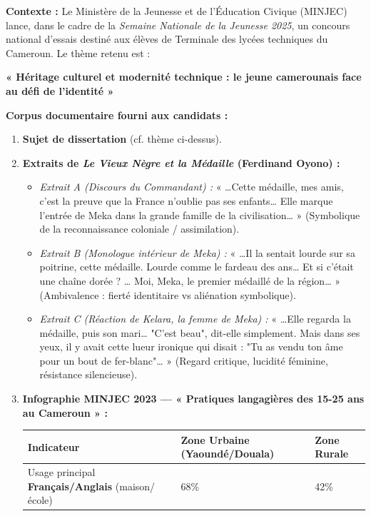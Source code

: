 \documentclass[11pt]{article}
\newcounter{popsec}
\newcounter{popsub}
\newcommand{\courssub}[1]{%
  \stepcounter{popsub}%
  \par\vspace{9pt}\noindent{\popxbold\fontsize{11.5}{13}\selectfont\color{popink}{\color{poporange}\thepopsec.\thepopsub}\hspace{6pt}#1}\par\nopagebreak\vspace{4pt}
}
\begin{document}
\courssub{Situation}
\noindent \textbf{Contexte :} Le Ministère de la Jeunesse et de l'Éducation Civique (MINJEC) lance, dans le cadre de la \emph{Semaine Nationale de la Jeunesse 2025}, un concours national d'essais destiné aux élèves de Terminale des lycées techniques du Cameroun. Le thème retenu est :
\begin{center}
    \textbf{« Héritage culturel et modernité technique : le jeune camerounais face au défi de l'identité »}
\end{center}

\noindent \textbf{Corpus documentaire fourni aux candidats :}
\begin{enumerate}
    \item \textbf{Sujet de dissertation} (cf. thème ci-dessus).
    \item \textbf{Extraits de \emph{Le Vieux Nègre et la Médaille} (Ferdinand Oyono) :}
        \begin{itemize}
            \item \textit{Extrait A (Discours du Commandant) :} « …Cette médaille, mes amis, c'est la preuve que la France n'oublie pas ses enfants… Elle marque l'entrée de Meka dans la grande famille de la civilisation… » (Symbolique de la reconnaissance coloniale / assimilation).
            \item \textit{Extrait B (Monologue intérieur de Meka) :} « …Il la sentait lourde sur sa poitrine, cette médaille. Lourde comme le fardeau des ans… Et si c'était une chaîne dorée ? … Moi, Meka, le premier médaillé de la région… » (Ambivalence : fierté identitaire vs aliénation symbolique).
            \item \textit{Extrait C (Réaction de Kelara, la femme de Meka) :} « …Elle regarda la médaille, puis son mari… "C'est beau", dit-elle simplement. Mais dans ses yeux, il y avait cette lueur ironique qui disait : "Tu as vendu ton âme pour un bout de fer-blanc"… » (Regard critique, lucidité féminine, résistance silencieuse).
        \end{itemize}
    \item \textbf{Infographie MINJEC 2023 — « Pratiques langagières des 15-25 ans au Cameroun » :}
        \begin{center}
            \begin{tabularx}{\linewidth}{|l|X|X|}\hline
            \rowcolor{popblueL} \textbf{Indicateur} & \textbf{Zone Urbaine (Yaoundé/Douala)} & \textbf{Zone Rurale} \\ \hline
            Usage principal \textbf{Français/Anglais} (maison/école) & 68\% & 42\% \\ \hline

\end{tabularx}
\end{center}
\end{enumerate}
\end{document}
